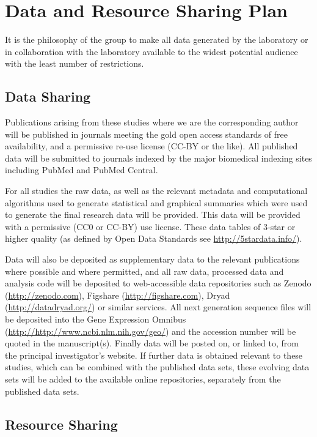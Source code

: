 \section{Data and Resource Sharing
Plan}\label{data-and-resource-sharing-plan}

It is the philosophy of the group to make all data generated by the
laboratory or in collaboration with the laboratory available to the
widest potential audience with the least number of restrictions.

\subsection{Data Sharing}\label{data-sharing}

Publications arising from these studies where we are the corresponding
author will be published in journals meeting the gold open access
standards of free availability, and a permissive re-use license (CC-BY
or the like). All published data will be submitted to journals indexed
by the major biomedical indexing sites including PubMed and PubMed
Central.

For all studies the raw data, as well as the relevant metadata and
computational algorithms used to generate statistical and graphical
summaries which were used to generate the final research data will be
provided. This data will be provided with a permissive (CC0 or CC-BY)
use license. These data tables of 3-star or higher quality (as defined
by Open Data Standards see \url{http://5stardata.info/}).

Data will also be deposited as supplementary data to the relevant
publications where possible and where permitted, and all raw data,
processed data and analysis code will be deposited to web-accessible
data repositories such as Zenodo (\url{http://zenodo.com}), Figshare
(\url{http://figshare.com}), Dryad (\url{http://datadryad.org/}) or
similar services. All next generation sequence files will be deposited
into the Gene Expression Omnibus
(\url{http://http://www.ncbi.nlm.nih.gov/geo/}) and the accession number
will be quoted in the manuscript(s). Finally data will be posted on, or
linked to, from the principal investigator's website. If further data is
obtained relevant to these studies, which can be combined with the
published data sets, these evolving data sets will be added to the
available online repositories, separately from the published data sets.

\subsection{Resource Sharing}\label{resource-sharing}

